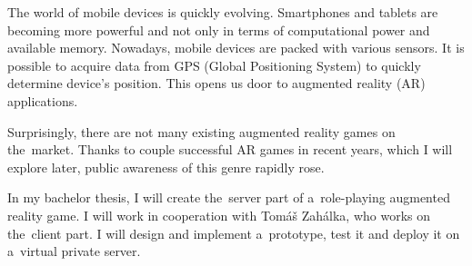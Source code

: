 The world of mobile devices is quickly evolving. Smartphones and tablets are becoming more powerful and not only in terms of computational power and available memory. Nowadays, mobile devices are packed with various sensors. It is possible to acquire data from GPS (Global Positioning System) to quickly determine device’s position. This opens us door to augmented
reality (AR) applications. 

Surprisingly, there are not many existing augmented reality games on the~market. Thanks to couple successful AR games in recent years, which I will explore later,  public awareness of this genre rapidly rose.

In my bachelor thesis, I will create the~server part of a~role-playing augmented reality game. I will work in cooperation with Tomáš Zahálka, who works on the~client part. I will design and implement a~prototype, test it and deploy it on a~virtual private server.
